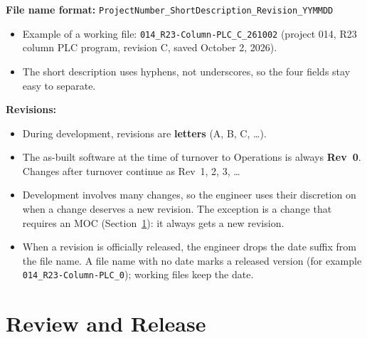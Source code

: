 \textbf{File name format:} \texttt{ProjectNumber\_ShortDescription\_Revision\_YYMMDD}
\begin{itemize}[itemsep=1pt]
  \item Example of a working file: \texttt{014\_R23-Column-PLC\_C\_261002} (project 014, R23 column PLC program, revision C, saved October 2, 2026).
  \item The short description uses hyphens, not underscores, so the four fields stay easy to separate.
\end{itemize}

\textbf{Revisions:}
\begin{itemize}[itemsep=1pt]
  \item During development, revisions are \textbf{letters} (A, B, C, \ldots).
  \item The as-built software at the time of turnover to Operations is always \textbf{Rev~0}. Changes after turnover continue as Rev~1, 2, 3, \ldots
  \item Development involves many changes, so the engineer uses their discretion on when a change deserves a new revision. The exception is a change that requires an MOC (Section~\ref{sec:review-release}): it always gets a new revision.
  \item When a revision is officially released, the engineer drops the date suffix from the file name. A file name with no date marks a released version (for example \texttt{014\_R23-Column-PLC\_0}); working files keep the date.
\end{itemize}


\section{Review and Release}\label{sec:review-release}
\begin{center}
\end{center}


